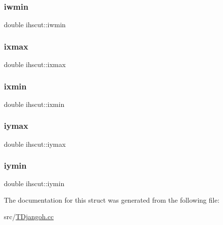 \mbox{\label{structihscut_a99892c106e212590c37e0e095c981b2a}} 
\subsubsection{\texorpdfstring{iwmin}{iwmin}}
{\footnotesize\ttfamily double ihscut\+::iwmin}

\mbox{\label{structihscut_a20fe5bd4389c0fa0c2692397d9395bc0}} 
\subsubsection{\texorpdfstring{ixmax}{ixmax}}
{\footnotesize\ttfamily double ihscut\+::ixmax}

\mbox{\label{structihscut_a5678e21c7e6fa3cc27175a5d2f2a0c7b}} 
\subsubsection{\texorpdfstring{ixmin}{ixmin}}
{\footnotesize\ttfamily double ihscut\+::ixmin}

\mbox{\label{structihscut_a435b3d3dff4faf5e23379d384f9b0ff7}} 
\subsubsection{\texorpdfstring{iymax}{iymax}}
{\footnotesize\ttfamily double ihscut\+::iymax}

\mbox{\label{structihscut_a5d156345a0fe1ca2dbd3ed09b258b6c2}} 
\subsubsection{\texorpdfstring{iymin}{iymin}}
{\footnotesize\ttfamily double ihscut\+::iymin}



The documentation for this struct was generated from the following file\+:\begin{DoxyCompactItemize}
\item 
src/\hyperlink{_t_djangoh_8cc}{T\+Djangoh.\+cc}\end{DoxyCompactItemize}
